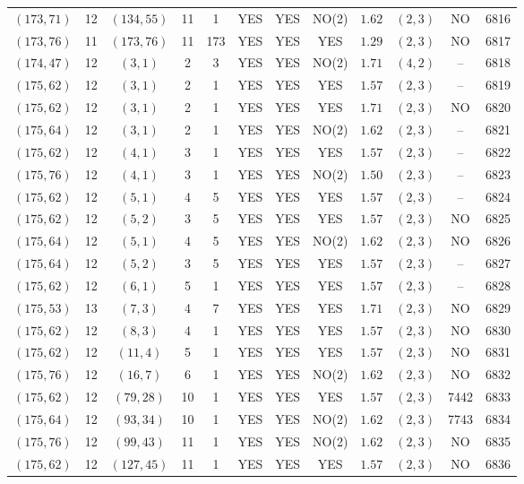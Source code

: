 \begin{longtable}{|c|c|c|c|c|c|c|c|c|c|c|c|}
$(173,71)$ & 12 & $(134,55)$ & 11 & 1 & YES & YES & NO(2) & $1.62$ & $(2,3)$ & NO & 6816\\
$(173,76)$ & 11 & $(173,76)$ & 11 & 173 & YES & YES & YES & $1.29$ & $(2,3)$ & NO & 6817\\
$(174,47)$ & 12 & $(3,1)$ & 2 & 3 & YES & YES & NO(2) & $1.71$ & $(4,2)$ & -- & 6818\\
$(175,62)$ & 12 & $(3,1)$ & 2 & 1 & YES & YES & YES & $1.57$ & $(2,3)$ & -- & 6819\\
$(175,62)$ & 12 & $(3,1)$ & 2 & 1 & YES & YES & YES & $1.71$ & $(2,3)$ & NO & 6820\\
$(175,64)$ & 12 & $(3,1)$ & 2 & 1 & YES & YES & NO(2) & $1.62$ & $(2,3)$ & -- & 6821\\
$(175,62)$ & 12 & $(4,1)$ & 3 & 1 & YES & YES & YES & $1.57$ & $(2,3)$ & -- & 6822\\
$(175,76)$ & 12 & $(4,1)$ & 3 & 1 & YES & YES & NO(2) & $1.50$ & $(2,3)$ & -- & 6823\\
$(175,62)$ & 12 & $(5,1)$ & 4 & 5 & YES & YES & YES & $1.57$ & $(2,3)$ & -- & 6824\\
$(175,62)$ & 12 & $(5,2)$ & 3 & 5 & YES & YES & YES & $1.57$ & $(2,3)$ & NO & 6825\\
$(175,64)$ & 12 & $(5,1)$ & 4 & 5 & YES & YES & NO(2) & $1.62$ & $(2,3)$ & NO & 6826\\
$(175,64)$ & 12 & $(5,2)$ & 3 & 5 & YES & YES & YES & $1.57$ & $(2,3)$ & -- & 6827\\
$(175,62)$ & 12 & $(6,1)$ & 5 & 1 & YES & YES & YES & $1.57$ & $(2,3)$ & -- & 6828\\
$(175,53)$ & 13 & $(7,3)$ & 4 & 7 & YES & YES & YES & $1.71$ & $(2,3)$ & NO & 6829\\
$(175,62)$ & 12 & $(8,3)$ & 4 & 1 & YES & YES & YES & $1.57$ & $(2,3)$ & NO & 6830\\
$(175,62)$ & 12 & $(11,4)$ & 5 & 1 & YES & YES & YES & $1.57$ & $(2,3)$ & NO & 6831\\
$(175,76)$ & 12 & $(16,7)$ & 6 & 1 & YES & YES & NO(2) & $1.62$ & $(2,3)$ & NO & 6832\\
$(175,62)$ & 12 & $(79,28)$ & 10 & 1 & YES & YES & YES & $1.57$ & $(2,3)$ & 7442 & 6833\\
$(175,64)$ & 12 & $(93,34)$ & 10 & 1 & YES & YES & NO(2) & $1.62$ & $(2,3)$ & 7743 & 6834\\
$(175,76)$ & 12 & $(99,43)$ & 11 & 1 & YES & YES & NO(2) & $1.62$ & $(2,3)$ & NO & 6835\\
$(175,62)$ & 12 & $(127,45)$ & 11 & 1 & YES & YES & YES & $1.57$ & $(2,3)$ & NO & 6836\\

\end{longtable}
